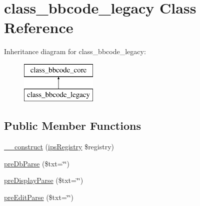 \hypertarget{classclass__bbcode__legacy}{\section{class\-\_\-bbcode\-\_\-legacy Class Reference}
\label{classclass__bbcode__legacy}
}
Inheritance diagram for class\-\_\-bbcode\-\_\-legacy\-:\begin{figure}[H]
\begin{center}
\leavevmode
\includegraphics[height=2.000000cm]{classclass__bbcode__legacy}
\end{center}
\end{figure}
\subsection*{Public Member Functions}
\begin{DoxyCompactItemize}
\item 
\hyperlink{classclass__bbcode__legacy_a178c3a93e57e75dd87a5d39112af0b07}{\-\_\-\-\_\-construct} (\hyperlink{classips_registry}{ips\-Registry} \$registry)
\item 
\hyperlink{classclass__bbcode__legacy_aea1919f4d4d425b66d1a63314da38aaf}{pre\-Db\-Parse} (\$txt=\char`\"{}\char`\"{})
\item 
\hyperlink{classclass__bbcode__legacy_abbb08647886418bf857c94e5f4262423}{pre\-Display\-Parse} (\$txt=\char`\"{}\char`\"{})
\item 
\hyperlink{classclass__bbcode__legacy_ad3d23bc194e2cb81f6387acb027597cd}{pre\-Edit\-Parse} (\$txt=\char`\"{}\char`\"{})
\end{DoxyCompactItemize}

